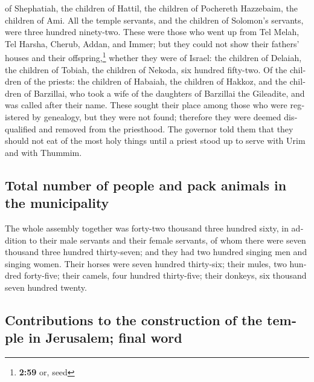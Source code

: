 \begin{paracol}{2}
\begin{otherlanguage}{english}
of Shephatiah, the children of Hattil, the children of Pochereth
Hazzebaim, the children of Ami.  All the temple servants,
and the children of Solomon's servants, were three hundred ninety-two.
 These were those who went up from Tel Melah, Tel Harsha,
Cherub, Addan, and Immer; but they could not show their fathers' houses
and their offspring,\footnote{\textbf{2:59} or, seed} whether they were
of Israel:  the children of Delaiah, the children of
Tobiah, the children of Nekoda, six hundred fifty-two. 
Of the children of the priests: the children of Habaiah, the children of
Hakkoz, and the children of Barzillai, who took a wife of the daughters
of Barzillai the Gileadite, and was called after their name.
 These sought their place among those who were registered
by genealogy, but they were not found; therefore they were deemed
disqualified and removed from the priesthood.  The
governor told them that they should not eat of the most holy things
until a priest stood up to serve with Urim and with Thummim.

\hypertarget{total-number-of-people-and-pack-animals-in-the-municipality}{%
\subsection{Total number of people and pack animals in the
municipality}\label{total-number-of-people-and-pack-animals-in-the-municipality}}

 The whole assembly together was forty-two thousand three
hundred sixty,  in addition to their male servants and
their female servants, of whom there were seven thousand three hundred
thirty-seven; and they had two hundred singing men and singing women.
 Their horses were seven hundred thirty-six; their mules,
two hundred forty-five;  their camels, four hundred
thirty-five; their donkeys, six thousand seven hundred twenty.

\hypertarget{contributions-to-the-construction-of-the-temple-in-jerusalem-final-word}{%
\subsection{Contributions to the construction of the temple in
Jerusalem; final
word}\label{contributions-to-the-construction-of-the-temple-in-jerusalem-final-word}}


\end{otherlanguage}
\end{paracol}

